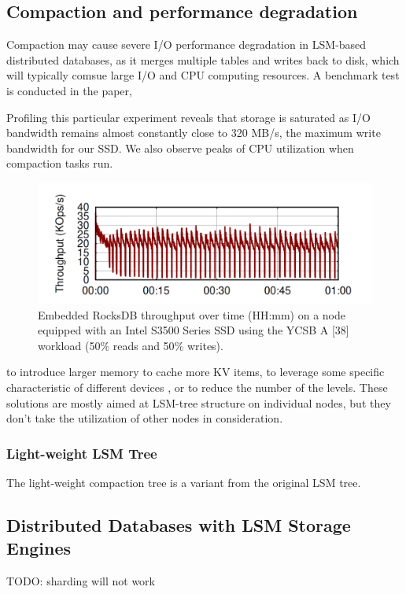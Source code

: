 \documentclass[a4paper,10pt,twoside]{article}
\begin{document}
\subsection{Compaction and performance degradation}
Compaction may cause severe I/O performance degradation in LSM-based distributed databases, 
as it merges multiple tables and writes back to disk, which will typically comsue large I/O and CPU computing resources.
A benchmark test is conducted in the paper\cite{mainpaper}, 
\begin{displayquote}
	Profiling this particular experiment
	reveals that storage is saturated as I/O bandwidth remains
	almost constantly close to 320 MB/s, the maximum write
	bandwidth for our SSD. We also observe peaks of CPU utilization
	when compaction tasks run. 
\end{displayquote}
\begin{figure}[h]
    \centering
	\includegraphics[scale=0.3]{Campaction perf.png}
    \caption{Embedded RocksDB throughput over time (HH:mm) on
	a node equipped with an Intel S3500 Series SSD using the YCSB
	A [38] workload (50$\%$ reads and 50$\%$ writes).}
    \label{fig:mesh1}
\end{figure}
to introduce larger memory to cache more KV items, 
to leverage some specific characteristic of different devices \cite{10.1145/3033273, 10.5555/2813767.2813783}, or to reduce the number of the levels\cite{SMRDB}.
These solutions are mostly aimed at LSM-tree structure on individual nodes, but they don't take the utilization of other nodes in consideration.

\subsubsection{Light-weight LSM Tree}
The light-weight compaction tree \cite{Yao2017ALC} is a variant from the original LSM tree.

\subsection{Distributed Databases with LSM Storage Engines}
TODO: sharding will not work
\end{document}
